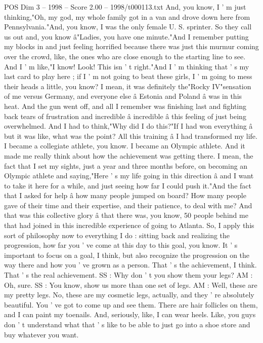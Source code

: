 \begin{textsample}{POS Dim 3 – 1998 – Score 2.00 – 1998/t000113.txt}
And, you know, I ' m just thinking,"Oh, my god, my whole family got in a van and drove down here from Pennsylvania."And, you know, I was the only female U.
S. sprinter.
So they call us out and, you know â"Ladies, you have one minute."And I remember putting my blocks in and just feeling horrified because there was just this murmur coming over the crowd, like, the ones who are close enough to the starting line to see.
And I ' m like,"I know!
Look!
This isn ' t right."And I ' m thinking that ' s my last card to play here ; if I ' m not going to beat these girls, I ' m going to mess their heads a little, you know?
I mean, it was definitely the"Rocky IV"sensation of me versus Germany, and everyone else â Estonia and Poland â was in this heat.
And the gun went off, and all I remember was finishing last and fighting back tears of frustration and incredible â incredible â this feeling of just being overwhelmed.
And I had to think,"Why did I do this?"If I had won everything â but it was like, what was the point?
All this training â I had transformed my life.
I became a collegiate athlete, you know.
I became an Olympic athlete.
And it made me really think about how the achievement was getting there.
I mean, the fact that I set my sights, just a year and three months before, on becoming an Olympic athlete and saying,"Here ' s my life going in this direction â and I want to take it here for a while, and just seeing how far I could push it."And the fact that I asked for help â how many people jumped on board?
How many people gave of their time and their expertise, and their patience, to deal with me?
And that was this collective glory â that there was, you know, 50 people behind me that had joined in this incredible experience of going to Atlanta.
So, I apply this sort of philosophy now to everything I do : sitting back and realizing the progression, how far you ' ve come at this day to this goal, you know.
It ' s important to focus on a goal, I think, but also recognize the progression on the way there and how you ' ve grown as a person.
That ' s the achievement, I think.
That ' s the real achievement.
SS : Why don ' t you show them your legs?
AM : Oh, sure.
SS : You know, show us more than one set of legs.
AM : Well, these are my pretty legs.
No, these are my cosmetic legs, actually, and they ' re absolutely beautiful.
You ' ve got to come up and see them.
There are hair follicles on them, and I can paint my toenails.
And, seriously, like, I can wear heels.
Like, you guys don ' t understand what that ' s like to be able to just go into a shoe store and buy whatever you want.

\end{textsample}
